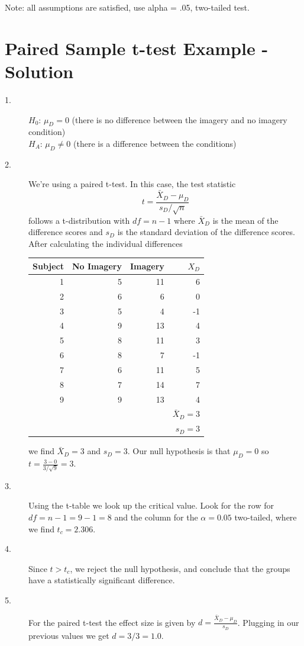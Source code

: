 \documentclass{tufte-handout}
\begin{document}
Note: all assumptions are satisfied, use alpha = .05, two-tailed test.

\pagebreak

\section{Paired Sample t-test Example - Solution}
\begin{fullwidth}
\begin{description}
\item[1.] $H_0$: $\mu_D=0$ (there is no difference between the imagery and no imagery condition)\\
$H_A$: $\mu_D\neq0$ (there is a difference between the conditions)

\item[2.] We're using a paired t-test. In this case, the test statistic
\begin{equation*}
t=\frac{\bar{X}_D-\mu_D}{s_D/\sqrt{n}}
\end{equation*}
follows a t-distribution with $df=n-1$ where $\bar{X}_D$ is the mean of the difference scores and $s_D$ is the standard deviation of the difference scores. After calculating the individual differences

\begin{table}
  \centering
  \selectfont
  \begin{tabular}{rrrr}
    \toprule
Subject&	No Imagery&	Imagery&	$X_D$\\
    \midrule
1&	5&	11&	6\\
2&	6&	6&	0\\
3&	5&	4&	-1\\
4&	9&	13&	4\\
5&	8&	11&	3\\
6&	8&	7&	-1\\
7&	6&	11&	5\\
8&	7&	14&	7\\
9&	9&	13&	4\\
    \bottomrule
&&&$\bar{X}_D=3$\\
&&&$s_D=3$\\
    \bottomrule
  \end{tabular}
  \label{tab:normaltab}
\end{table}
\vspace{20pt}
we find  $\bar{X}_D=3$ and  $s_D=3$. Our null hypothesis is that $\mu_D=0$ so $t=\frac{3-0}{3/\sqrt{9}}=3$.

\item[3.] Using the t-table we look up the critical value. Look for the row for $df=n-1=9-1=8$ and the column for the $\alpha=0.05$ two-tailed, where we find $t_c=2.306$.
\item[4.] Since $t>t_c$, we reject the null hypothesis, and conclude that the groups have a statistically significant difference.
\item[5.]For the paired t-test the effect size is given by $d=\frac{\bar{X}_D-\mu_D}{s_D}$. Plugging in our previous values we get $d=3/3 = 1.0$.
\end{description}
\end{fullwidth}
\end{document}
